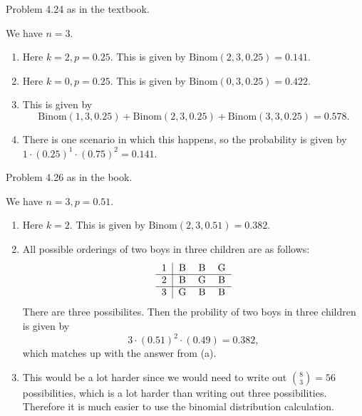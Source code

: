 \begin{prob}
    Problem 4.24 as in the textbook.
\end{prob}
\begin{solution}
    We have $n=3$.
    \begin{enumerate}[label=(\alph*)]
    \setlength\itemsep{-.2em}
\item Here $k=2, p=0.25.$ This is given by  $\mathrm{Binom}(2,3,0.25)=0.141$.
\item Here $k=0, p=0.25$. This is given by  $\mathrm{Binom}(0,3,0.25)=0.422$.
\item This is given by \[
        \mathrm{Binom}(1,3,0.25)+\mathrm{Binom}(2,3,0.25)+\mathrm{Binom}(3,3,0.25)=0.578.
    \] 
\item There is one scenario in which this happens, so the probability is given by $1 \cdot (0.25)^1 \cdot (0.75)^2=0.141$.
    \end{enumerate}
\end{solution}
\begin{prob}
    Problem 4.26 as in the book.
\end{prob}
\begin{solution}
    We have $n=3, p=0.51$.
     \begin{enumerate}[label=(\alph*)]
    \setlength\itemsep{-.2em}
\item Here $k=2$. This is given by  $\mathrm{Binom}(2,3,0.51)=0.382$.
\item All possible orderings of two boys in three children are as follows: \[
\begin{tabular}{c|ccc} 
    1 & B & B & G \\ \hline
    2 & B & G & B \\ \hline
    3 & G & B & B
\end{tabular}
\] There are three possibilites. Then the probility of two boys in three children is given by \[
3 \cdot (0.51)^2 \cdot (0.49)=0.382,
\] which matches up with the answer from (a).
\item This would be a lot harder since we would need to write out ${8 \choose 3} =56$ possibilities, which is a lot harder than writing out three possibilities. Therefore it is much easier to use the binomial distribution calculation.
    \end{enumerate}
\end{solution}
